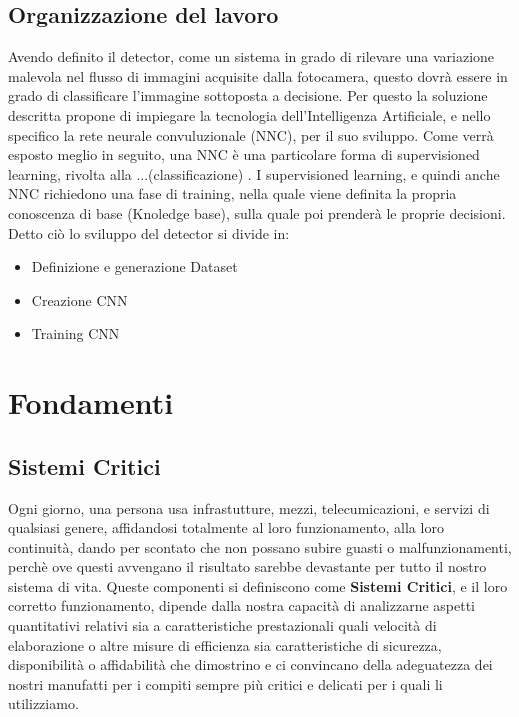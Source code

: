 \documentclass[14pt]{extarticle}
\begin{document}
\subsection{Organizzazione del lavoro} 
Avendo definito il detector, come un sistema in grado di rilevare una variazione malevola nel flusso di immagini acquisite dalla fotocamera, questo dovrà essere in grado di classificare l'immagine sottoposta a decisione. 
Per questo la soluzione descritta propone di impiegare la tecnologia dell'Intelligenza Artificiale, e nello specifico la rete neurale convuluzionale (NNC), per il suo sviluppo.
Come verrà esposto meglio in seguito, una NNC è una particolare forma di supervisioned learning, rivolta alla ...(classificazione) . I supervisioned learning, e quindi anche NNC richiedono una fase di training, nella quale viene definita  la propria conoscenza di base (Knoledge base), sulla quale poi prenderà le proprie decisioni.
Detto ciò lo sviluppo del detector si divide in:
\begin{itemize}
\item Definizione e generazione Dataset
\item Creazione CNN
\item Training CNN
\end{itemize}
\section{Fondamenti}
\subsection{Sistemi Critici}
Ogni giorno, una persona usa infrastutture, mezzi, telecumicazioni, e servizi di qualsiasi genere, affidandosi totalmente al loro funzionamento, alla loro continuità, dando per scontato che non possano subire guasti o malfunzionamenti, perchè ove questi avvengano il risultato sarebbe devastante per tutto il nostro sistema di vita. Queste componenti si definiscono come \textbf{Sistemi Critici}, e  il loro corretto funzionamento, dipende dalla nostra capacità di analizzarne aspetti quantitativi relativi sia a caratteristiche prestazionali quali velocità di elaborazione o altre misure di efficienza
sia caratteristiche di sicurezza, disponibilità o affidabilità che dimostrino e ci
convincano della adeguatezza dei nostri manufatti per i compiti sempre più
critici e delicati per i quali li utilizziamo.
\end{document}
